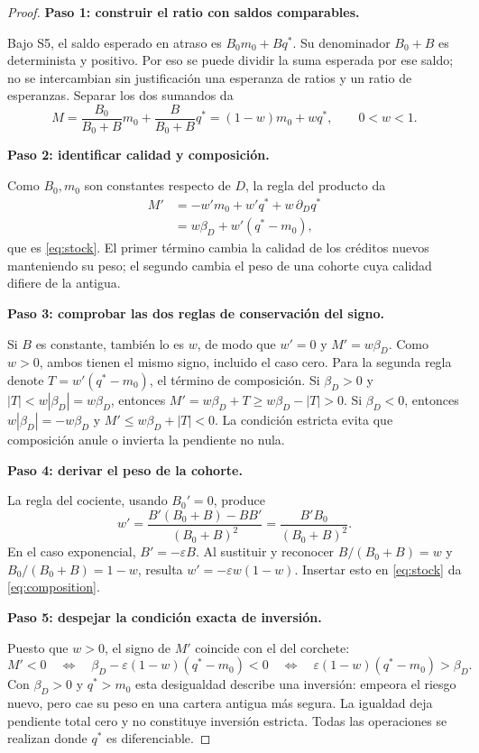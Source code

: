 \documentclass[11pt]{article}
\theoremstyle{definition}\newtheorem{assumption}{Supuesto}
\begin{document}
\begin{proof}
\textbf{Paso 1: construir el ratio con saldos comparables.}\par
Bajo S5, el saldo esperado en atraso es $B_0m_0+Bq^*$. Su denominador
$B_0+B$ es determinista y positivo. Por eso se puede dividir la suma esperada
por ese saldo; no se intercambian sin justificación una esperanza de ratios
y un ratio de esperanzas. Separar los dos sumandos da
\[
M=\frac{B_0}{B_0+B}m_0+\frac{B}{B_0+B}q^*
  =(1-w)m_0+wq^*,\qquad 0<w<1.
\]

\textbf{Paso 2: identificar calidad y composición.}\par
Como $B_0,m_0$ son constantes respecto de $D$, la regla del producto da
\begin{align*}
M'&=-w'm_0+w'q^*+w\,\partial_Dq^*\\
  &=w\beta_D+w'(q^*-m_0),
\end{align*}
que es \eqref{eq:stock}. El primer término cambia la calidad de los créditos
nuevos manteniendo su peso; el segundo cambia el peso de una cohorte cuya
calidad difiere de la antigua.

\textbf{Paso 3: comprobar las dos reglas de conservación del signo.}\par
Si $B$ es constante, también lo es $w$, de modo que $w'=0$ y
$M'=w\beta_D$. Como $w>0$, ambos tienen el mismo signo, incluido el caso cero.
Para la segunda regla denote $T=w'(q^*-m_0)$, el término de composición.
Si $\beta_D>0$ y $|T|<w|\beta_D|=w\beta_D$, entonces
$M'=w\beta_D+T\ge w\beta_D-|T|>0$. Si $\beta_D<0$, entonces
$w|\beta_D|=-w\beta_D$ y
$M'\le w\beta_D+|T|<0$. La condición estricta evita que composición
anule o invierta la pendiente no nula.

\textbf{Paso 4: derivar el peso de la cohorte.}\par
La regla del cociente, usando $B_0'=0$, produce
\[
w'=\frac{B'(B_0+B)-BB'}{(B_0+B)^2}
   =\frac{B'B_0}{(B_0+B)^2}.
\]
En el caso exponencial, $B'= -\varepsilon B$. Al sustituir y reconocer
$B/(B_0+B)=w$ y $B_0/(B_0+B)=1-w$, resulta
$w'=-\varepsilon w(1-w)$. Insertar esto en \eqref{eq:stock} da
\eqref{eq:composition}.

\textbf{Paso 5: despejar la condición exacta de inversión.}\par
Puesto que $w>0$, el signo de $M'$ coincide con el del corchete:
\[
M'<0\quad\Longleftrightarrow\quad
\beta_D-\varepsilon(1-w)(q^*-m_0)<0
\quad\Longleftrightarrow\quad
\varepsilon(1-w)(q^*-m_0)>\beta_D.
\]
Con $\beta_D>0$ y $q^*>m_0$ esta desigualdad describe una inversión: empeora
el riesgo nuevo, pero cae su peso en una cartera antigua más segura. La
igualdad deja pendiente total cero y no constituye inversión estricta.
Todas las operaciones se realizan donde $q^*$ es diferenciable.
\end{proof}
\end{document}
